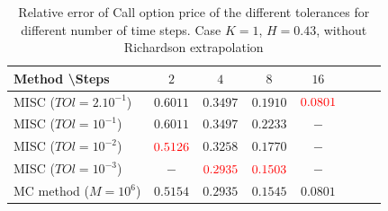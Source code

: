 \documentclass[11pt]{article}
\begin{document}
\begin{table}[h!]
	\centering
	\begin{tabular}{l*{6}{c}r}
		Method \textbackslash  Steps            & $2$ & $4$ & $8$ & $16$ &   \\
		\hline
		MISC ($TOl=2.10^{-1}$)  &  $0.6011$ & $0.3497$ &$0.1910$ & ${\color{red}0.0801}$  \\
		MISC ($TOl=10^{-1}$)  & $0.6011$ & $0.3497$ & $0.2233$ & $-$  \\
		MISC ($TOl=10^{-2}$)  & ${\color{red}0.5126}$ & $0.3258$ & $0.1770$ & $-$   \\	
		MISC ($TOl=10^{-3}$)  & $	-$ & ${\color{red}0.2935}$ & ${\color{red}0.1503}$ & $-$   \\
		MC method ($M=10^{6}$)   & $\mathbf{0.5154}$  & $\mathbf{0.2935}$  & $\mathbf{0.1545}$ & $\mathbf{0.0801}$  \\	
		\hline
	\end{tabular}
	\caption{Relative error of Call option price of the different tolerances for different number of time steps. Case $K=1$, $H=0.43$, without Richardson extrapolation}
	\label{Relative error of Call option price of the different tolerances for different number of time steps. Case $K=1, H=0.43$}
\end{table}
\end{document}
